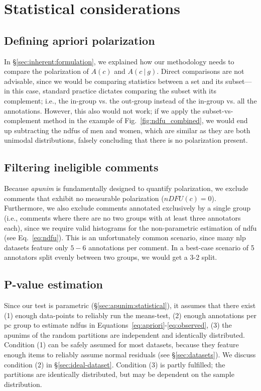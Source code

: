 \documentclass[11pt]{article}
\theoremstyle{definition}
\theoremstyle{plain}
\newcommand\given[1][]{\:#1\vert\:}
\begin{document}
\section{Statistical considerations}
\label{app:stats}

\subsection{Defining apriori polarization}
\label{app:stats:comparison}

In \S\ref{sec:inherent:formulation}, we explained how our methodology needs to compare the polarization of $A(c)$ and $A(c \given g)$. Direct comparisons are not advisable, since we would be comparing statistics between a set and its subset---in this case, standard practice dictates comparing the subset with its complement; i.e., the in-group vs. the out-group instead of the in-group vs. all the annotations. However, this also would not work; if we apply the subset-vs-complement method in the example of Fig.~\ref{fig:ndfu_combined}, we would end up subtracting the \acp{ndfu} of men and women, which are similar as they are both unimodal distributions, falsely concluding that there is no polarization present.


\subsection{Filtering ineligible comments}
\label{app:stats:filtering}

Because \textit{apunim} is fundamentally designed to quantify polarization, we exclude comments that exhibit no measurable polarization ($nDFU(c)=0$). Furthermore, we also exclude comments annotated exclusively by a single group (i.e., comments where there are no two groups with at least three annotators each), since we require valid histograms for the non-parametric estimation of \ac{ndfu} (see Eq.~\ref{eq:ndfu}). This is an unfortunately common scenario, since many \ac{nlp} datasets feature only $5-6$ annotations per comment. In a best-case scenario of 5 annotators split evenly between two groups, we would get a 3-2 split.


\subsection{P-value estimation}
\label{app:stats:pvalue}

Since our test is parametric (\S\ref{sec:apunim:statistical}), it assumes that there exist (1) enough data-points to reliably run the means-test, (2) enough annotations per \ac{pc} group to estimate \acp{ndfu} in Equations~\ref{eq:apriori}-\ref{eq:observed}, (3) the apunims of the random partitions are independent and identically distributed. Condition (1) can be safely assumed for most datasets, because they feature enough items to reliably assume normal residuals (see \S\ref{sec:datasets}). We discuss condition (2) in \S\ref{sec:ideal-dataset}. Condition (3) is partly fulfilled; the partitions are identically distributed, but may be dependent on the sample distribution. 
\end{document}

